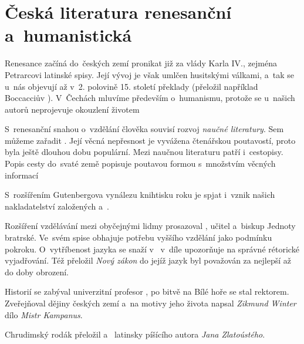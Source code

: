 \chapter{Česká literatura renesanční a~humanistická} %
Renesance začíná do~českých zemí pronikat již za vlády Karla IV., zejména Petrarcovi latinské spisy. Její vývoj je 
však umlčen husitskými válkami, a~tak se u~nás objevují až v~2. polovině 15. století překlady 
(přeložil například Boccacciův ). V~Čechách mluvíme především o~humanismu, protože se u~našich
autorů neprojevuje okouzlení životem

S~renesanční snahou o~vzdělání člověka souvisí rozvoj \textit{naučné literatury}. Sem můžeme zařadit 
 . Její věcná nepřesnost je vyvážena 
čtenářskou poutavostí, proto byla ještě dlouhou dobu populární. Mezi naučnou literaturu patří i~cestopisy. Popis cesty 
do~svaté země popisuje poutavou formou s~množstvím věcných informací 

S~rozšířením Gutenbergova vynálezu knihtisku roku  je spjat i~vznik našich nakladatelství založených
 a~.

Rozšíření vzdělávání mezi obyčejnými lidmy prosazoval , učitel a~biskup Jednoty bratrské.
Ve~svém spise  obhajuje potřebu vyššího vzdělání jako podmínku pokroku.
O~vytříbenost jazyka se snaží v~ v~díle  upozorňuje na správné 
rétorické vyjadřování. Též přeložil \textit{Nový zákon} do  jejíž jazyk byl považován 
za nejlepší až do doby obrození.

Historií se zabýval univerzitní profesor , po bitvě na Bílé hoře se stal rektorem.
Zveřejňoval dějiny českých zemí a~na motivy jeho života napsal \textit{Zikmund Winter} dílo \textit{Mistr Kampanus}.

Chrudimský rodák  přeložil  a~
latinsky píšícího autora \textit{Jana Zlatoústého}. 